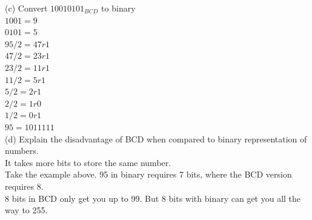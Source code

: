 \documentclass[12pt,a4paper]{report}
\begin{document}
\begin{normalsize}
(c) Convert $ 10010101_{BCD} $ to binary \\
$ 1001 = 9 $ \\
$ 0101 = 5 $ \\
$ 95/2 = 47r1 $ \\
$ 47/2 = 23r1 $ \\
$ 23/2 = 11r1 $ \\
$ 11/2 = 5r1 $ \\
$ 5/2 = 2r1 $ \\
$ 2/2 = 1r0 $ \\
$ 1/2 = 0r1 $ \\
$ 95 = 1011111 $ \\

(d) Explain the disadvantage of BCD when compared to binary representation of numbers. \\
It takes more bits to store the same number. \\
Take the example above. 95 in binary requires 7 bits, where the BCD version requires 8. \\
8 bits in BCD only get you up to 99. But 8 bits with binary can get you all the way to 255. \\

\end{normalsize}
\end{document}
